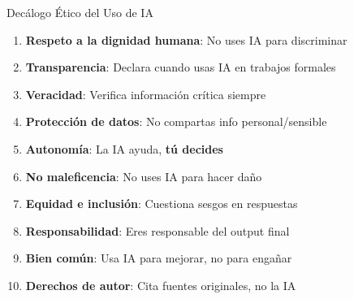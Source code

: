\documentclass[aspectratio=169,xcolor={dvipsnames}]{beamer}
\begin{document}
	\begin{frame}{Decálogo Ético del Uso de IA}
		
		\begin{enumerate}
			\item \textbf{Respeto a la dignidad humana}: No uses IA para discriminar
			
			\item \textbf{Transparencia}: Declara cuando usas IA en trabajos formales
			
			\item \textbf{Veracidad}: Verifica información crítica siempre
			
			\item \textbf{Protección de datos}: No compartas info personal/sensible
			
			\item \textbf{Autonomía}: La IA ayuda, \textbf{tú decides}
			
			\item \textbf{No maleficencia}: No uses IA para hacer daño
			
			\item \textbf{Equidad e inclusión}: Cuestiona sesgos en respuestas
			
			\item \textbf{Responsabilidad}: Eres responsable del output final
			
			\item \textbf{Bien común}: Usa IA para mejorar, no para engañar
			
			\item \textbf{Derechos de autor}: Cita fuentes originales, no la IA
		\end{enumerate}
		
	\end{frame}
	
\end{document}
